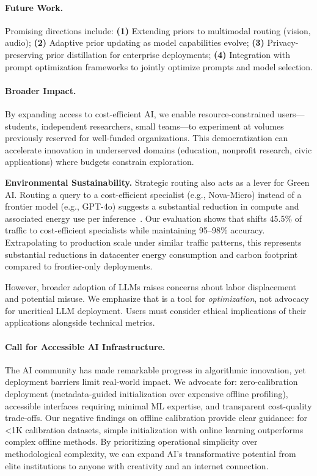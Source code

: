 \paragraph{Future Work.}
Promising directions include: \textbf{(1)} Extending priors to multimodal routing (vision, audio); \textbf{(2)} Adaptive prior updating as model capabilities evolve; \textbf{(3)} Privacy-preserving prior distillation for enterprise deployments; \textbf{(4)} Integration with prompt optimization frameworks to jointly optimize prompts and model selection.

\paragraph{Broader Impact.}
By expanding access to cost-efficient AI, we enable resource-constrained users---students, independent researchers, small teams---to experiment at volumes previously reserved for well-funded organizations. This democratization can accelerate innovation in underserved domains (education, nonprofit research, civic applications) where budgets constrain exploration.

\textbf{Environmental Sustainability.} Strategic routing also acts as a lever for Green AI. Routing a query to a cost-efficient specialist (e.g., Nova-Micro) instead of a frontier model (e.g., GPT-4o) suggests a substantial reduction in compute and associated energy use per inference~\cite{luccioni2023power}. Our evaluation shows that \ours{} shifts 45.5\% of traffic to cost-efficient specialists while maintaining 95--98\% accuracy. Extrapolating to production scale under similar traffic patterns, this represents substantial reductions in datacenter energy consumption and carbon footprint compared to frontier-only deployments.

However, broader adoption of LLMs raises concerns about labor displacement and potential misuse. We emphasize that \ours{} is a tool for \emph{optimization}, not advocacy for uncritical LLM deployment. Users must consider ethical implications of their applications alongside technical metrics.

\paragraph{Call for Accessible AI Infrastructure.}
The AI community has made remarkable progress in algorithmic innovation, yet deployment barriers limit real-world impact. We advocate for: zero-calibration deployment (metadata-guided initialization over expensive offline profiling), accessible interfaces requiring minimal ML expertise, and transparent cost-quality trade-offs. Our negative findings on offline calibration provide clear guidance: for <1K calibration datasets, simple initialization with online learning outperforms complex offline methods. By prioritizing operational simplicity over methodological complexity, we can expand AI's transformative potential from elite institutions to anyone with creativity and an internet connection.


